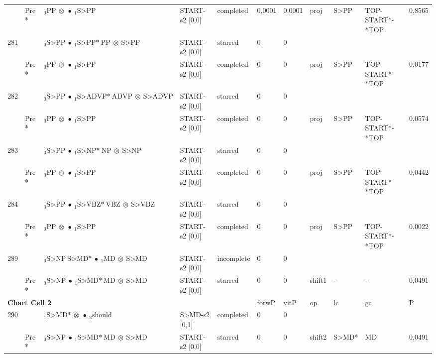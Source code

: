 \documentclass[10pt]{article}
\begin{document}
\begin{longtable}[htbp]{lllllllllll}
 & Pre *& $ {}_0 \textrm{PP} \  \otimes \  \bullet \ {}_{1} \textrm{S>PP} $ & START-s2 [0,0] & completed & 0,0001 & 0,0001 & proj & S>PP & TOP-START*-*TOP & 0,8565 \\ 
281 & & $ {}_0 \textrm{S>PP} \  \bullet \ {}_{1} \textrm{S>PP*} \ \textrm{PP} \  \otimes \ \textrm{S>PP} $ & START-s2 [0,0] & starred & 0 & 0 & & & & \\ 
 & Pre *& $ {}_0 \textrm{PP} \  \otimes \  \bullet \ {}_{1} \textrm{S>PP} $ & START-s2 [0,0] & completed & 0 & 0 & proj & S>PP & TOP-START*-*TOP & 0,0177 \\ 
282 & & $ {}_0 \textrm{S>PP} \  \bullet \ {}_{1} \textrm{S>ADVP*} \ \textrm{ADVP} \  \otimes \ \textrm{S>ADVP} $ & START-s2 [0,0] & starred & 0 & 0 & & & & \\ 
 & Pre *& $ {}_0 \textrm{PP} \  \otimes \  \bullet \ {}_{1} \textrm{S>PP} $ & START-s2 [0,0] & completed & 0 & 0 & proj & S>PP & TOP-START*-*TOP & 0,0574 \\ 
283 & & $ {}_0 \textrm{S>PP} \  \bullet \ {}_{1} \textrm{S>NP*} \ \textrm{NP} \  \otimes \ \textrm{S>NP} $ & START-s2 [0,0] & starred & 0 & 0 & & & & \\ 
 & Pre *& $ {}_0 \textrm{PP} \  \otimes \  \bullet \ {}_{1} \textrm{S>PP} $ & START-s2 [0,0] & completed & 0 & 0 & proj & S>PP & TOP-START*-*TOP & 0,0442 \\ 
284 & & $ {}_0 \textrm{S>PP} \  \bullet \ {}_{1} \textrm{S>VBZ*} \ \textrm{VBZ} \  \otimes \ \textrm{S>VBZ} $ & START-s2 [0,0] & starred & 0 & 0 & & & & \\ 
 & Pre *& $ {}_0 \textrm{PP} \  \otimes \  \bullet \ {}_{1} \textrm{S>PP} $ & START-s2 [0,0] & completed & 0 & 0 & proj & S>PP & TOP-START*-*TOP & 0,0022 \\ 
289 & & $ {}_0 \textrm{S>NP} \ \textrm{S>MD*} \  \bullet \ {}_{1} \textrm{MD} \  \otimes \ \textrm{S>MD} $ & START-s2 [0,0] & incomplete & 0 & 0 & & & & \\ 
 & Pre *& $ {}_0 \textrm{S>NP} \  \bullet \ {}_{1} \textrm{S>MD*} \ \textrm{MD} \  \otimes \ \textrm{S>MD} $ & START-s2 [0,0] & starred & 0 & 0 & shift1 & - & - & 0,0491 \\ 
\hline \multicolumn{5}{l}{\textbf{Chart Cell 2}} & forwP & vitP & op. & lc & gc & P \\ \hline
290 & & $ {}_1 \textrm{S>MD*} \  \otimes \  \bullet \ {}_{2} \textrm{should} $ & S>MD-s2 [0,1] & completed & 0 & 0 & & & & \\ 
 & Pre *& $ {}_0 \textrm{S>NP} \  \bullet \ {}_{1} \textrm{S>MD*} \ \textrm{MD} \  \otimes \ \textrm{S>MD} $ & START-s2 [0,0] & starred & 0 & 0 & shift2 & S>MD* & MD & 0,0491 \\ 

\end{longtable}
\end{document}
